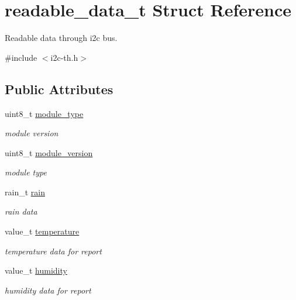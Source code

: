 \hypertarget{structreadable__data__t}{}\section{readable\+\_\+data\+\_\+t Struct Reference}
\label{structreadable__data__t}


Readable data through i2c bus.  




{\ttfamily \#include $<$i2c-\/th.\+h$>$}

\subsection*{Public Attributes}
\begin{DoxyCompactItemize}
\item 
\mbox{\label{structreadable__data__t_a650c71ad521e965abe34eafda7cf872d}} 
uint8\+\_\+t \hyperlink{structreadable__data__t_a650c71ad521e965abe34eafda7cf872d}{module\+\_\+type}
\begin{DoxyCompactList}\small\item\em module version \end{DoxyCompactList}\item 
\mbox{\label{structreadable__data__t_a0b5fa5d2d89bef1b53036512525127f0}} 
uint8\+\_\+t \hyperlink{structreadable__data__t_a0b5fa5d2d89bef1b53036512525127f0}{module\+\_\+version}
\begin{DoxyCompactList}\small\item\em module type \end{DoxyCompactList}\item 
\mbox{\label{structreadable__data__t_a183ab6eb973fe8deb1c6d0583a991e92}} 
rain\+\_\+t \hyperlink{structreadable__data__t_a183ab6eb973fe8deb1c6d0583a991e92}{rain}
\begin{DoxyCompactList}\small\item\em rain data \end{DoxyCompactList}\item 
\mbox{\label{structreadable__data__t_a5852a1cd826e865b18a07fa4be784c6d}} 
value\+\_\+t \hyperlink{structreadable__data__t_a5852a1cd826e865b18a07fa4be784c6d}{temperature}
\begin{DoxyCompactList}\small\item\em temperature data for report \end{DoxyCompactList}\item 
\mbox{\label{structreadable__data__t_ab296c803ef271e46364679c955711e26}} 
value\+\_\+t \hyperlink{structreadable__data__t_ab296c803ef271e46364679c955711e26}{humidity}
\begin{DoxyCompactList}\small\item\em humidity data for report \end{DoxyCompactList}\end{DoxyCompactItemize}


